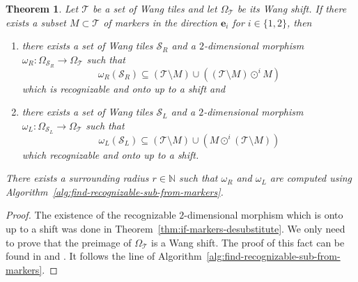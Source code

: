 \documentclass[12pt]{amsart}
\newtheorem{theorem}[definition]{Theorem}
\newcommand{\N}{\mathbb{N}}
\newcommand{\be}{{\boldsymbol{e}}}
\newcommand{\Scal}{\mathcal{S}}
\newcommand{\Tcal}{\mathcal{T}}
\begin{document}
\begin{theorem}\label{thm:if-markers-desubstitute-wang-version}
    {\rm\cite{MR3978536,MR4226493}}
    Let $\Tcal$ be a set of Wang tiles 
    and let $\Omega_\Tcal$ be its Wang shift.
    If there exists a subset
    $M\subset\Tcal$ 
    of markers in the direction 
    $\be_i$ for $i\in\{1,2\}$,
    then 
\begin{enumerate}%
\item there exists
    a set of Wang tiles $\Scal_R$
    and a $2$-dimensional morphism
    $\omega_R:\Omega_{\Scal_R}\to\Omega_\Tcal$
    such that 
    \begin{equation*}
        \omega_R(\Scal_R)\subseteq (\Tcal\setminus M)\cup 
        \left((\Tcal\setminus M)\odot^i M\right)
    \end{equation*}
    which is recognizable and onto up to a shift and
\item
    there exists a set of Wang tiles $\Scal_L$ and a $2$-dimensional morphism
    $\omega_L:\Omega_{\Scal_L}\to\Omega_\Tcal$
    such that 
    \begin{equation*}
        \omega_L(\Scal_L)\subseteq (\Tcal\setminus M)\cup 
        \left(M\odot^i (\Tcal\setminus M)\right)
    \end{equation*}
    which recognizable and onto up to a shift.
\end{enumerate}
    There exists a surrounding radius $r\in\N$ such that $\omega_R$ and
    $\omega_L$ are computed using
    Algorithm~\ref{alg:find-recognizable-sub-from-markers}.
\end{theorem}


\begin{proof}
The existence of the recognizable $2$-dimensional morphism
which is onto up to a shift was done in Theorem~\ref{thm:if-markers-desubstitute}.
We only need to prove that the preimage of $\Omega_\Tcal$ is a Wang shift. The proof
    of this fact can be found in \cite{MR3978536} and
    \cite{MR4226493}.
It follows the line of Algorithm~\ref{alg:find-recognizable-sub-from-markers}.
\end{proof}
\end{document}
